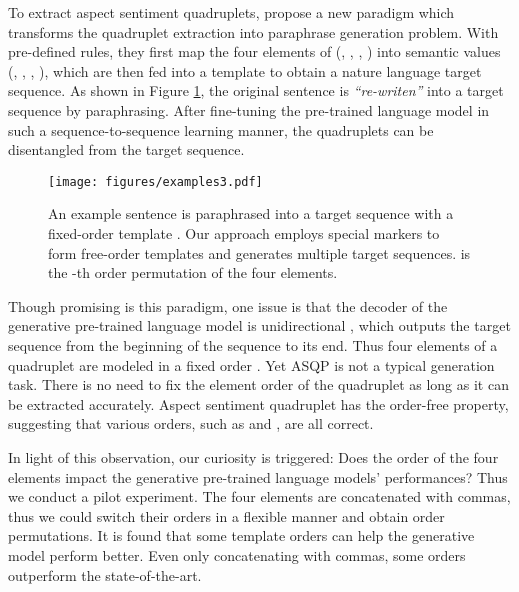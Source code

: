 \documentclass[11pt]{article}
\begin{document}
To extract aspect sentiment quadruplets, \citet{zhang-etal-2021-aspect-sentiment} propose a new paradigm which transforms the quadruplet extraction into paraphrase generation problem. With pre-defined rules, they first map the four elements of (, , , ) into semantic values (, , , ), which are then fed into a template to obtain a nature language target sequence. As shown in Figure \ref{fig:examples}, the original sentence is \emph{``re-writen''} into a target sequence by paraphrasing. After fine-tuning the pre-trained language model \cite{JMLR:v21:20-074} in such a sequence-to-sequence learning manner, the quadruplets can be disentangled from the target sequence.


\begin{figure}[t]
\centering
\texttt{[image: figures/examples3.pdf]} 
\caption{An example sentence is paraphrased into a target sequence with a fixed-order template \cite{zhang-etal-2021-aspect-sentiment}. Our approach employs special markers to form free-order templates and generates multiple target sequences.  is the -th order permutation of the four elements.}
\label{fig:examples}
\end{figure}

Though promising is this paradigm, one issue is that the decoder of the generative pre-trained language model \cite{JMLR:v21:20-074} is unidirectional \cite{vinyals2015order}, which outputs the target sequence from the beginning of the sequence to its end. Thus four elements of a quadruplet are modeled in a fixed order . Yet ASQP is not a typical generation task. There is no need to fix the element order of the quadruplet as long as it can be extracted accurately. Aspect sentiment quadruplet has the order-free property, suggesting that various orders, such as  and , are all correct.


In light of this observation, our curiosity is triggered: Does the order of the four elements impact the generative pre-trained language models' performances? Thus we conduct a pilot experiment. The four elements are concatenated with commas, thus we could switch their orders in a flexible manner and obtain order permutations. It is found that some template orders can help the generative model perform better. Even only concatenating with commas, some orders outperform the state-of-the-art.  
\end{document}

